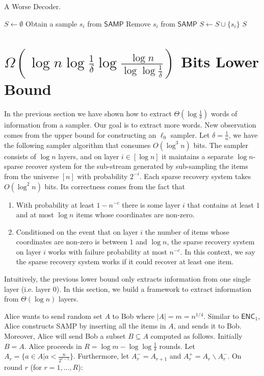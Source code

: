 \documentclass[10pt]{article}
\newcommand{\samp}{\textsf{SAMP}\xspace}
\newcommand{\enc}{\textsf{ENC}\xspace}
\newcommand{\dec}{\textsf{DEC}\xspace}
\begin{document}
\begin{algorithm}[H]
\caption{A Worse Decoder.}
\begin{algorithmic}[1]
\Procedure{$\dec_1'$}{\samp}
\State $S\leftarrow \emptyset$
\State Obtain a sample $s_i$ from $\samp$
\State Remove $s_i$ from $\samp$
\State $S \leftarrow S \cup \{s_i\}$
\EndFor
\State \Return $S$ 
\EndProcedure
\end{algorithmic}
\end{algorithm}


\section{$\Omega(\log n \log {\frac{1}{\delta}} \log \frac{\log n}{\log\log \frac{1}{\delta}})$ Bits Lower Bound}

In the previous section we have shown how to extract $\Theta(\log \frac{1}{\delta})$ words of information from a sampler. 
Our goal is to extract more words. New observation comes from the upper bound for constructing an $\ell_0$ sampler. 
Let $\delta=\frac{1}{n}$, we have the following sampler algorithm that consumes $O(\log^3 n)$ bits. 
The sampler consists of $\log n$ layers, and on layer $i\in [\log n]$ it maintains a separate $\log n$-sparse recover system for the sub-stream generated by sub-sampling the items from the universe $[n]$ with probability $2^{-i}$.
Each sparse recovery system takes $O(\log^2 n)$ bits. 
Its correctness comes from the fact that 
\begin{enumerate}
\item With probability at least $1-n^{-c}$ there is some layer $i$ that contains at least $1$ and at most $\log n$ items whose coordinates are non-zero. 
\item Conditioned on the event that on layer $i$ the number of items whose coordinates are non-zero is between $1$ and $\log n$, the sparse recovery system on layer $i$ works with failure probability at most $n^{-c}$. In this context, we say the sparse recovery system works if it could recover at least one item. 
\end{enumerate}

Intuitively, the previous lower bound only extracts information from one single layer (i.e. layer $0$). In this section, we build a framework to extract information from $\Theta(\log n)$ layers. 

Alice wants to send random set $A$ to Bob where $|A|=m=n^{1/4}$. Similar to $\enc_1$, Alice constructs \samp by inserting all the items in $A$, and sends it to Bob. Moreover, Alice will send Bob a subset $B\subseteq A$ computed as follows. Initially $B=A$. Alice proceeds in $R=\log m - \log\log \frac{1}{\delta}$ rounds. Let $A_r = \{a\in A|a<\frac{n}{2^{r-1}}\}$. Furthermore, let $A_r^{-}=A_{r+1}$ and $A_r^{+}=A_r \backslash A_r^{-}$. On round $r$ (for $r=1,\ldots,R$):
\end{document}
